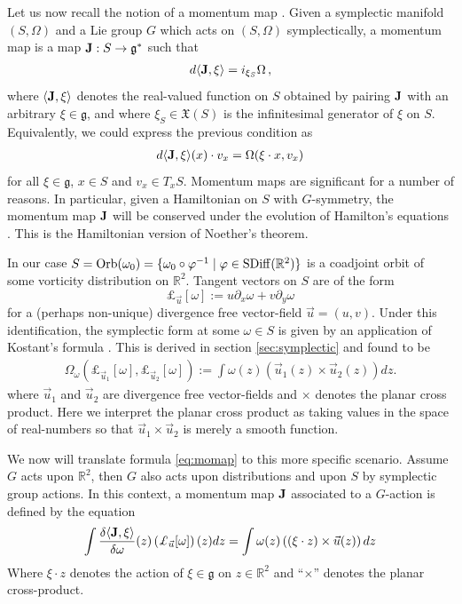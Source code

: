 \documentclass[12pt]{amsart}
\newcommand{\R}{\ensuremath{\mathbb{R}}}
\theoremstyle{remark}
\DeclareMathOperator{\SDiff}{SDiff}
\begin{document}
Let us now recall the notion of a momentum map \cite[Definition 4.2.1]{FOM}.
Given a symplectic manifold $(S,\Omega)$ and a Lie group $G$ which acts on $(S,\Omega)$ symplectically, a momentum map is a map ${\bf J}:S \to \mathfrak{g}^*$ such that
\begin{align*}
  d \langle {\bf J} , \xi \rangle = i_{\xi_S} \Omega\,,
\end{align*}
where $\langle {\bf J} , \xi \rangle$ denotes the real-valued function on $S$ obtained by pairing ${\bf J}$ with an arbitrary
 $\xi \in \mathfrak{g}$, and where $\xi_S \in \mathfrak{X}(S)$ is the infinitesimal generator of $\xi$ on $S$.
Equivalently, we could express the previous condition as
\begin{align}
  d \langle {\bf J},\xi \rangle(x) \cdot v_x = \Omega( \xi\cdot x , v_x ) \label{eq:momap}
\end{align}
for all $\xi \in \mathfrak{g}$, $x \in S$ and $v_x \in T_xS$.
Momentum maps are significant for a number of reasons.
In particular, given a Hamiltonian on $S$ with $G$-symmetry, the momentum map ${\bf J}$ will be conserved under the evolution of
Hamilton's equations \cite[Theorem 4.2.2]{FOM}.
This is the Hamiltonian version of Noether's theorem.

In our case $S = {\rm Orb}(\omega_0) = \{ \omega_0 \circ \varphi^{-1} \mid \varphi \in \SDiff(\mathbb{R}^2) \}$ is a coadjoint orbit of some vorticity distribution on $\mathbb{R}^2$.
Tangent vectors on $S$ are of the form $$\pounds_{\vec{u}} [\omega] := u \partial_x \omega + v \partial_y \omega$$ for a (perhaps non-unique) divergence free vector-field $\vec{u} = (u,v)$.
Under this identification, the symplectic form at some $\omega \in S$ is given by an application of Kostant's formula \cite{FOM}.
This is derived in section \ref{sec:symplectic} and found to be
\begin{align*}
  \Omega_\omega( \pounds_{\vec{u}_1}[\omega] , \pounds_{\vec{u}_2} [\omega] ) :=
  \int \omega(z) ( \vec{u}_1(z) \times \vec{u}_2(z) ) dz.
\end{align*}
where $\vec{u}_1$ and $\vec{u}_2$ are divergence free vector-fields and $\times$ denotes the planar cross product.
Here we interpret the planar cross product as taking values in the space of real-numbers so that $\vec{u}_1 \times \vec{u}_2$ is
merely a smooth function.

We now will translate formula \eqref{eq:momap} to this more specific scenario.
Assume $G$ acts upon $\mathbb{R}^2$, then $G$ also acts upon distributions and upon $S$ by symplectic group actions.
In this context, a momentum map ${\bf J}$ associated to a $G$-action is defined by the equation
\begin{align}
  \int \frac{\delta  \langle {\bf J} , \xi \rangle }{\delta \omega} (z)  \left( \pounds_{\vec{u}}[\omega] \right)(z) dz = \int \omega(z)  \left( (\xi \cdot z) \times \vec{u}(z) \right)dz \label{eq:momap2}
\end{align}
Where $\xi \cdot z$ denotes the action of $\xi \in \mathfrak{g}$ on $z \in \R^2$
and ``$\times$'' denotes the planar cross-product.
\end{document}
